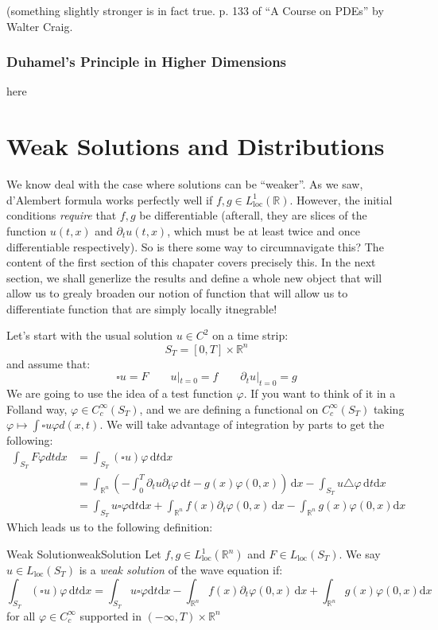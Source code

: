 \documentclass{book}
\newcommand{\R}{{\mathbb{R}}}
\renewcommand{\phi}{\varphi}
\begin{document}
(something slightly stronger is in fact true. p. 133 of ``A Course on PDEs'' by Walter Craig.

\subsection{Duhamel's Principle in Higher Dimensions}

here

\chapter{Weak Solutions and Distributions}\label{cha:distrib}

We know deal with the case where solutions can be ``weaker''. As we saw, d'Alembert formula works perfectly well if $f,g
\in L_{\text{loc}}^1(\R)$. However, the initial conditions \emph{require} that $f,g$ be differentiable (afterall, they
are slices of the function $u(t,x)$ and $  \partial_t u(t,x)$, which must be at least twice and once differentiable
respectively). So is there some way to circumnavigate this? The content of the first section of this chapater covers precisely
this. In the next section, we shall generlize the results and define a whole new object that will allow us to grealy
broaden our notion of function that will allow us to differentiate function that are simply locally itnegrable!

Let's start with the usual solution $u \in C^2$ on a time strip:
\[
	S_T = [0, T]\times \R^n
\]
and assume that:
\[
	\square u = F\qquad u|_{t=0} = f \qquad  \partial_t u|_{t=0} = g
\]
We are going to use the idea of a test function $\phi$. If you want to think of it in a Folland way, $\phi \in
C_c^\infty(S_T)$, and we are defining a functional on $C_c^\infty(S_T)$ taking $\phi \mapsto \int \square u \phi
d(x,t)$. We will take advantage of integration by parts to get the following:
\begin{align*}
	\int_{S_T} F\phi dtdx &= \int_{S_T}(\square u)\phi\, \textrm{d}t\textrm{d}x\\
  &= \int_{\R^n} \left( - \int_{0}^{T}  \partial_t u  \partial_t \phi\,\textrm{d}t - g(x)\phi(0, x) \right)\,\textrm{d}x
  - \int_{S_T} u\triangle \phi\, \textrm{d}t \textrm{d}x\\
  &= \int_{S_T} u\square \phi \textrm{d}t \textrm{d}x + \int_{\R^n} f(x)  \partial_t \phi(0,x)\, \textrm{d}x
  - \int_{\R^n} g(x) \phi(0,x) \textrm{d}x
\end{align*}
Which leads us to the following definition:
\begin{defn}{Weak Solution}{weakSolution}
	Let $f,g \in L_{\text{loc}}^1(\R^n)$ and $F \in L_{\text{loc}}(S_T)$. We say $u \in L_{\text{loc}}(S_T)$ is
	a \emph{weak solution} of the wave equation if:
	\begin{equation}\label{eq:weakSolEq}
	  \int_{S_T}(\square u)\phi\, \textrm{d}t\textrm{d}x = \int_{S_T} u\square \phi \textrm{d}t \textrm{d}x - \int_{\R^n} f(x)  \partial_t \phi(0,x)\, \textrm{d}x
	  + \int_{\R^n} g(x) \phi(0,x) \textrm{d}x
	\end{equation}
	for all $\phi \in C_c^\infty$ supported in $(-\infty, T)\times \R^n$
\end{defn}
\end{document}
